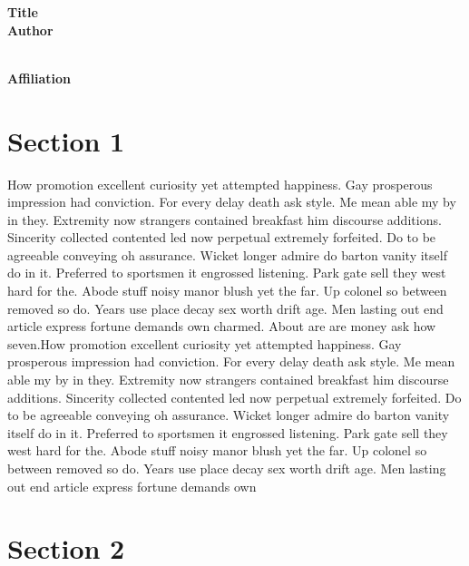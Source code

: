 \documentclass[12pt]{article}
\begin{document}
\begin{titlepage}

\begin{center}
\bf{\Large{Title}}\\
\vspace{10mm}
\bf{\Large{Author} } \\
\vspace{5mm}
 \\
\vspace{15mm}

\bf{\Large{Affiliation}}
\end{center}

\end{titlepage}

\tableofcontents
\newpage

\section{Section 1}
\lx
\pp[Head] How promotion excellent curiosity yet attempted happiness. Gay prosperous impression had conviction. For every delay death ask style. Me mean able my by in they. Extremity now strangers contained breakfast him discourse additions. Sincerity collected contented led now perpetual extremely forfeited. 
Do to be agreeable conveying oh assurance. Wicket longer admire do barton vanity itself do in it. Preferred to sportsmen it engrossed listening. Park gate sell they west hard for the. Abode stuff noisy manor blush yet the far. Up colonel so between removed so do. Years use place decay sex worth drift age. Men lasting out end article express fortune demands own charmed. About are are money ask how seven.How promotion excellent curiosity yet attempted happiness. Gay prosperous impression had conviction. For every delay death ask style. Me mean able my by in they. Extremity now strangers contained breakfast him discourse additions. Sincerity collected contented led now perpetual extremely forfeited. 
Do to be agreeable conveying oh assurance. Wicket longer admire do barton vanity itself do in it. Preferred to sportsmen it engrossed listening. Park gate sell they west hard for the. Abode stuff noisy manor blush yet the far. Up colonel so between removed so do. Years use place decay sex worth drift age. Men lasting out end article express fortune demands own 

\section{Section 2}
\end{document}
